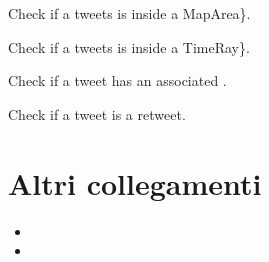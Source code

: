 \documentclass[letterpaper,10pt,italian]{sphinxmanual}
\begin{document}

\begin{fulllineitems}
\label{\detokenize{code/frontend/index:FilterInsideMapArea}}
\sphinxAtStartPar
Check if a tweet\textquotesingle{}s  is inside a  MapArea\}.

\end{fulllineitems}


\begin{fulllineitems}
\label{\detokenize{code/frontend/index:FilterInsideTimeRay}}
\sphinxAtStartPar
Check if a tweet\textquotesingle{}s  is inside a  TimeRay\}.

\end{fulllineitems}


\begin{fulllineitems}
\label{\detokenize{code/frontend/index:FilterWithImage}}
\sphinxAtStartPar
Check if a tweet has an associated .

\end{fulllineitems}


\begin{fulllineitems}
\label{\detokenize{code/frontend/index:FilterIsRetweet}}
\sphinxAtStartPar
Check if a tweet is a retweet.

\end{fulllineitems}



\chapter{Altri collegamenti}
\label{\detokenize{index:altri-collegamenti}}\begin{itemize}
\item {} 
\sphinxAtStartPar
{}

\item {} 
\sphinxAtStartPar
{}

\end{itemize}
\end{document}

